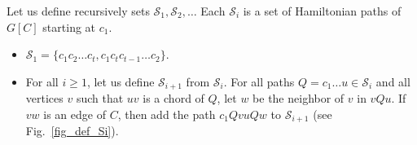 \documentclass[11pt]{article}
\begin{document}
\vspace{0.4cm}

Let us define recursively sets $\mathcal S_1, \mathcal S_2, \dots$ Each $\mathcal S_i$ is a set of Hamiltonian paths of $G[C]$ starting at $c_1$. 

\begin{itemize}
    \item    
$\mathcal S_1 = \{c_1 c_2 \dots c_t, c_1c_t c_{t-1} \dots c_2\}$.
\item 
For all $i\geq 1$, let us define $\mathcal S_{i+1}$ from $\mathcal S_{i}$.  For all paths $Q = c_1\dots u \in \mathcal S_i$ and all vertices $v$ such that $uv$ is a chord of $Q$, let $w$ be the neighbor of $v$ in $vQu$.  If $vw$ is an edge of $C$, then add the path $c_1QvuQw$ to $\mathcal S_{i+1}$ (see Fig.~\ref{fig_def_Si}). 
\end{itemize}
\end{document}
